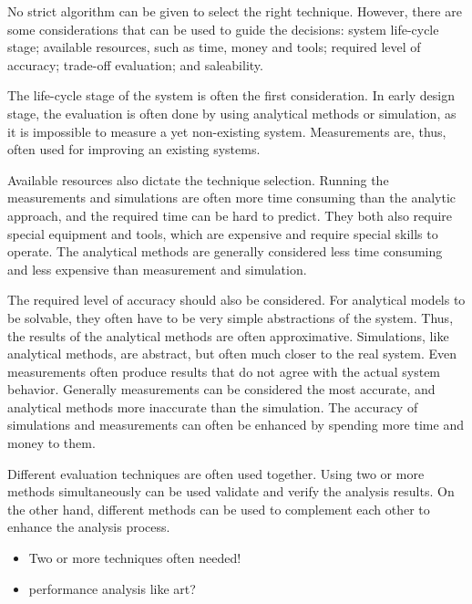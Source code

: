 No strict algorithm   can be given to select the right technique. However, there are some considerations that can be used to guide the decisions: system life-cycle stage; available resources, such as time, money and tools; required level of accuracy; trade-off evaluation; and saleability. \cite{jain:1991:AOCSPA}

The life-cycle stage of the system is often the first consideration. In early design stage, the evaluation is often done by using analytical methods or simulation, as it is impossible to measure a yet non-existing system. Measurements are, thus, often used for improving an existing systems. \cite{jain:1991:AOCSPA}

Available resources also dictate the technique selection. Running the measurements and simulations are often more time consuming \cite{Fujimoto:1990:PDE} than the analytic approach, and the required time can be hard to predict. They both also require special equipment and tools, which are expensive and require special skills to operate. The analytical methods are generally considered less time consuming and less expensive than measurement and simulation.  \cite{jain:1991:AOCSPA}

The required level of accuracy should also be considered. For analytical models to be solvable, they often have to be very simple abstractions of the system. Thus, the results of the analytical methods are often approximative. Simulations, like analytical methods, are abstract, but often much closer to the real system. Even measurements often produce results that do not agree with the actual system behavior. Generally measurements can be considered the most accurate, and analytical methods more inaccurate than the simulation. The accuracy of simulations and measurements can often be enhanced by spending more time and money to them. \cite{jain:1991:AOCSPA}

Different evaluation techniques are often used together. Using two or more methods simultaneously can be used validate and verify the analysis results. On the other hand, different methods can be used to complement each other to enhance the analysis process. \cite{jain:1991:AOCSPA}

\begin{itemize}
\item Two or more techniques often needed!
\item performance analysis like art?
\end{itemize}

